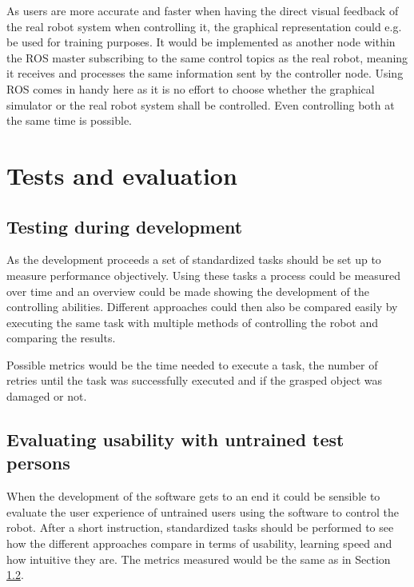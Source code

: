 \documentclass[a4paper]{article}
\begin{document}
As users are more accurate and faster when having the direct visual feedback of the real robot system when controlling it\cite{conf/humanoids/TohHLBZP12}, the graphical representation could e.g. be used for training purposes. It would be implemented as another node within the ROS master subscribing to the same control topics as the real robot, meaning it receives and processes the same information sent by the controller node. Using ROS comes in handy here as it is no effort to choose whether the graphical simulator or the real robot system shall be controlled. Even controlling both at the same time is possible.

\section{Tests and evaluation}

\subsection{Testing during development}

As the development proceeds a set of standardized tasks should be set up to measure performance objectively. Using these tasks a process could be measured over time and an overview could be made showing the development of the controlling abilities. Different approaches could then also be compared easily by executing the same task with multiple methods of controlling the robot and comparing the results.

Possible metrics would be the time needed to execute a task, the number of retries until the task was successfully executed and if the grasped object was damaged or not.

\subsection{Evaluating usability with untrained test persons}
\label{sec:testdev}
When the development of the software gets to an end it could be sensible to evaluate the user experience of untrained users using the software to control the robot. After a short instruction, standardized tasks should be performed to see how the different approaches compare in terms of usability, learning speed and how intuitive they are. The metrics measured would be the same as in Section \ref{sec:testdev}.

\pagebreak


\printbibliography
\end{document}
